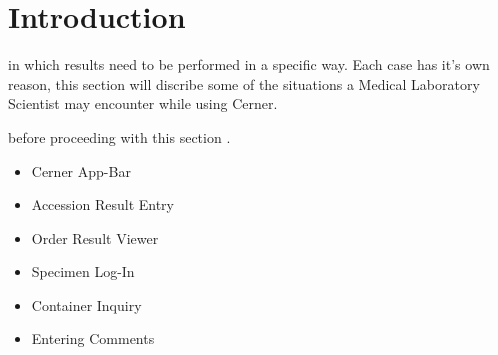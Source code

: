 \chapter*{Introduction}
 in which results need to be performed in a specific way. Each case has it's own reason, this section will discribe some of the situations a Medical Laboratory Scientist may encounter while using Cerner.

\bigskip

 before proceeding with this section%
.
\begin{itemize}
   \item Cerner App-Bar
   \item Accession Result Entry
   \item Order Result Viewer
   \item Specimen Log-In
   \item Container Inquiry
   \item Entering Comments
 \end{itemize}



